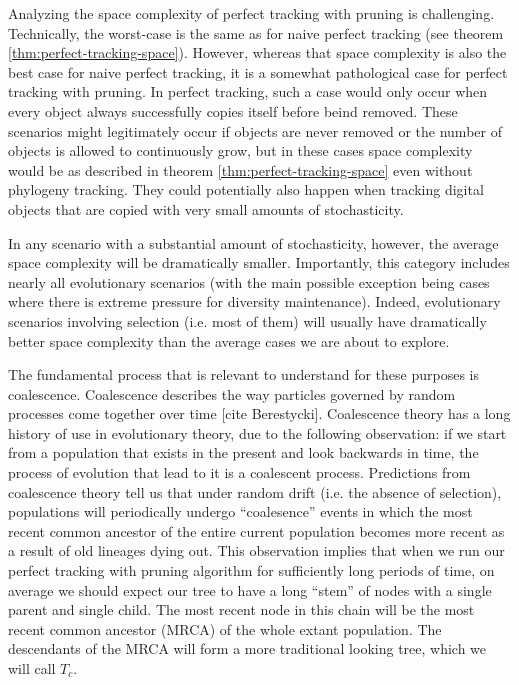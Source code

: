 Analyzing the space complexity of perfect tracking with pruning is challenging. 
Technically, the worst-case is the same as for naive perfect tracking (see theorem \ref{thm:perfect-tracking-space}).
However, whereas that space complexity is also the best case for naive perfect tracking, it is a somewhat pathological case for perfect tracking with pruning.
In perfect tracking, such a case would only occur when every object always successfully copies itself before beind removed.
These scenarios might legitimately occur if objects are never removed or the number of objects is allowed to continuously grow, but in these cases space complexity would be as described in theorem \ref{thm:perfect-tracking-space} even without phylogeny tracking.
They could potentially also happen when tracking digital objects that are copied with very small amounts of stochasticity.

In any scenario with a substantial amount of stochasticity, however, the average space complexity will be dramatically smaller.
Importantly, this category includes nearly all evolutionary scenarios (with the main possible exception being cases where there is extreme pressure for diversity maintenance). 
Indeed, evolutionary scenarios involving selection (i.e. most of them) will usually have dramatically better space complexity than the average cases we are about to explore.

The fundamental process that is relevant to understand for these purposes is coalescence. 
Coalescence describes the way particles governed by random processes come together over time [cite Berestycki].
Coalescence theory has a long history of use in evolutionary theory, due to the following observation:
if we start from a population that exists in the present and look backwards in time, the process of evolution that lead to it is a coalescent process.
Predictions from coalescence theory tell us that under random drift (i.e. the absence of selection), populations will periodically undergo ``coalesence'' 
events in which the most recent common ancestor of the entire current population becomes more recent as a result of old lineages dying out.
This observation implies that when we run our perfect tracking with pruning algorithm for sufficiently long periods of time, on average we should expect our tree to have a long ``stem'' of nodes with a single parent and single child.
The most recent node in this chain will be the most recent common ancestor (MRCA) of the whole extant population.
The descendants of the MRCA will form a more traditional looking tree, which we will call $T_c$.

